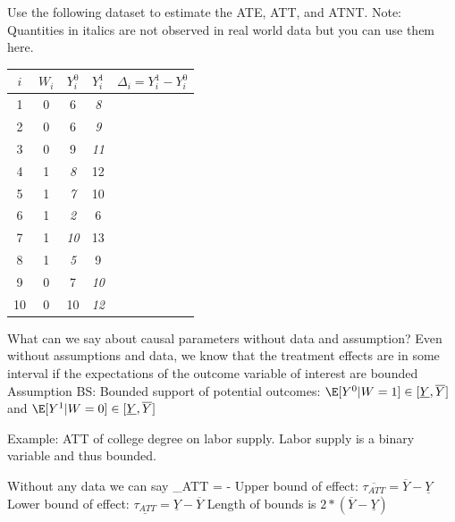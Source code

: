 \documentclass[
  25pt,         %
  a4paper,
  landscape,
  Screen4to3,
  footrule ]{foils}
\renewcommand{\pause}{}
\begin{document}
Use the following dataset to estimate the ATE, ATT, and ATNT. Note: Quantities in italics are not observed in real world data but you can use them here.
\begin{center}
\begin{small}
\begin{tabular}{ccccc}\hline 
$i$&$W_i$&$Y_i^0$&$Y_i^1$&$\Delta_i=Y_i^1-Y_i^0$\\\hline 
 1  & 0 & 6 & \textit{8} &  \\
2   & 0 & 6 & \textit{9} &  \\
3  & 0 & 9 & \textit{11} &  \\
4  & 1 & \textit{8} & 12 &  \\
 5  & 1 & \textit{7} & 10 &  \\
 6  & 1 & \textit{2} & 6 &  \\
 7   & 1 & \textit{10} & 13 &  \\
 8   & 1 & \textit{5} & 9 &  \\
 9   & 0 & 7 & \textit{10} &  \\
10   & 0 & 10 & \textit{12}&  \\\hline                      
  \end{tabular}
\end{small}
\end{center}




\bi 
\x What can we say about causal parameters without data and assumption?
\x Even without assumptions and data, we know that the treatment effects are in some interval if the expectations of the outcome variable of interest are bounded
\x Assumption BS: Bounded support of potential outcomes: $\E[Y^0|W=1]\in[\underline{Y},\overline{Y}]$ and $\E[Y^1|W=0]\in[\underline{Y},\overline{Y}]$
\ei
\bi 

\x Example: ATT of college degree on labor supply. Labor supply is a binary variable and thus bounded. 
\pause
\x Without any data we can say
    \vsm
    \bea
    \tau_{ATT} = \E[Y^1|W=1] - \E[Y^0|W=1] \nonumber
    \eea
\x Upper bound of effect: $\overline{\tau_{ATT}} = \overline{Y} - \underline{Y}$
\x Lower bound of effect:   $\underline{\tau_{ATT}} = \underline{Y} - \overline{Y}$
\x Length of bounds is $2*(\overline{Y}-\underline{Y})$
\ei
\end{document}
